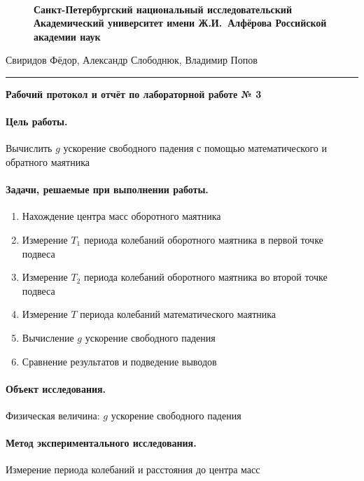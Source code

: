 \documentclass{article}
\begin{document}
	\begin{figure}[!]
\centering{\texttt{[image: a]}}\\
{\Large\bfseries Санкт-Петербургский национальный исследовательский Академический университет имени Ж.И.~Алфёрова Российской академии наук}
\end{figure}
\begin{center}
Свиридов Фёдор, Александр Слободнюк, Владимир Попов
\end{center}
\rule{12cm}{0.4mm}
\begin{center}
{\large\textbf{Рабочий протокол и отчёт по лабораторной работе № 3}}
\end{center}


\paragraph{Цель работы.}
Вычислить $g$ ускорение свободного падения с помощью математического
и обратного маятника

\paragraph{Задачи, решаемые при выполнении работы.}
\begin{enumerate}
	\item Нахождение центра масс оборотного маятника
	\item Измерение $ T_1 $ периода колебаний оборотного маятника в первой точке подвеса
	\item Измерение $ T_2 $ периода колебаний оборотного маятника во второй точке подвеса
	\item Измерение $ T$ периода колебаний математического маятника
	\item Вычисление $ g $ ускорение свободного падения
	\item Сравнение результатов и подведение выводов
\end{enumerate}

\paragraph{Объект исследования.}
Физическая величина: $ g $  ускорение свободного падения
\paragraph{Метод экспериментального исследования.}

Измерение периода колебаний и расстояния до центра масс
\end{document}
